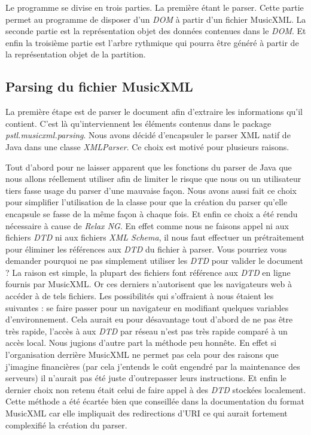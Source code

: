 \par
Le programme se divise en trois parties. La première étant le parser. Cette partie permet au programme de disposer d'un \emph{DOM} à partir d'un fichier MusicXML. La seconde partie est la représentation objet des données contenues dans le \emph{DOM}. Et enfin la troisième partie est l'arbre rythmique qui pourra être généré à partir de la représentation objet de la partition.

\subsection{Parsing du fichier MusicXML}

\par
La première étape est de parser le document afin d'extraire les informations qu'il contient. C'est là qu'interviennent les éléments contenus dans le package \emph{pstl.musicxml.parsing}. Nous avons décidé d'encapsuler le parser XML natif de Java dans une classe \emph{XMLParser}. Ce choix est motivé pour plusieurs raisons.

\par
Tout d'abord pour ne laisser apparent que les fonctions du parser de Java que nous allons réellement utiliser afin de limiter le risque que nous ou un utilisateur tiers fasse usage du parser d'une mauvaise façon. Nous avons aussi fait ce choix pour simplifier l'utilisation de la classe pour que la création du parser qu'elle encapsule se fasse de la même façon à chaque fois. Et enfin ce choix a été rendu nécessaire à cause de \emph{Relax NG}. En effet comme nous ne faisons appel ni aux fichiers \emph{DTD} ni aux fichiers \emph{XML Schema}, il nous faut effectuer un prétraitement pour éliminer les références aux \emph{DTD} du fichier à parser. Vous pourriez vous demander pourquoi ne pas simplement utiliser les \emph{DTD} pour valider le document ? La raison est simple, la plupart des fichiers font référence aux \emph{DTD} en ligne fournis par MusicXML. Or ces derniers n'autorisent que les navigateurs web à accéder à de tels fichiers. Les possibilités qui s'offraient à nous étaient les suivantes : se faire passer pour un navigateur en modifiant quelques variables d’environnement. Cela aurait eu pour désavantage tout d'abord de ne pas être très rapide, l'accès à aux \emph{DTD} par réseau n'est pas très rapide comparé à un accès local. Nous jugions d'autre part la méthode peu honnête. En effet si l'organisation derrière MusicXML ne permet pas cela pour des raisons que j'imagine financières (par cela j'entends le coût engendré par la maintenance des serveurs) il n'aurait pas été juste d'outrepasser leurs instructions. Et enfin le dernier choix non retenu était celui de faire appel à des \emph{DTD} stockées localement. Cette méthode a été écartée bien que conseillée dans la documentation du format MusicXML car elle impliquait des redirections d'URI ce qui aurait fortement complexifié la création du parser.


